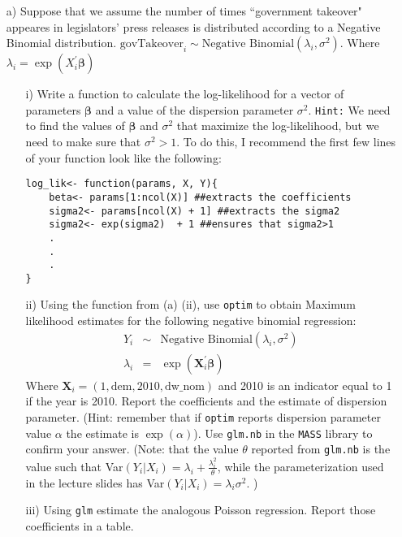\documentclass[letterpaper,12pt]{article}
\numberwithin{equation}{section}
\numberwithin{equation}{section}
\begin{document}
\begin{itemize}
\item[a)] Suppose that we assume the number of times ``government takeover" appeares in legislators' press releases is distributed according to a Negative Binomial distribution. $\text{govTakeover}_{i} \sim \text{Negative Binomial}(\lambda_{i}, \sigma^2)$.   Where $\lambda_{i} = \exp(X_{i}^{'}\boldsymbol{\beta})$
\begin{itemize}
\item[i)] Write a function to calculate the log-likelihood for a vector of parameters $\boldsymbol{\beta}$ and a value of the dispersion parameter $\sigma^2$.  {\tt Hint:} We need to find the values of $\boldsymbol{\beta}$ and $\sigma^2$ that maximize the log-likelihood, but we need to make sure that $\sigma^2>1$.  To do this, I recommend the first few lines of your function look like the following:

\begin{verbatim}
log_lik<- function(params, X, Y){
	beta<- params[1:ncol(X)] ##extracts the coefficients
	sigma2<- params[ncol(X) + 1] ##extracts the sigma2
	sigma2<- exp(sigma2)  + 1 ##ensures that sigma2>1
	.
	.
	.
}
\end{verbatim}

\item[ii)] Using the function from (a) (ii), use {\tt optim} to obtain Maximum likelihood estimates for the following negative binomial regression:
\begin{eqnarray}
Y_{i} & \sim & \text{Negative Binomial}(\lambda_{i}, \sigma^2) \nonumber \\
\lambda_{i} & = & \exp(\boldsymbol{X}_{i}^{'}\boldsymbol{\beta}) \nonumber
\end{eqnarray}
Where $\boldsymbol{X}_{i} = (1, \text{dem}, \text{2010}, \text{dw\_nom})$ and 2010 is an indicator equal to 1 if the year is 2010.  Report the coefficients and the estimate of dispersion parameter.  (Hint: remember that if {\tt optim} reports dispersion parameter value $\alpha$ the estimate is $\exp(\alpha)$).  Use {\tt glm.nb} in the {\tt MASS} library to confirm your answer.  (Note: that the value $\theta$ reported from {\tt glm.nb} is the value such that Var$(Y_{i}|X_{i} ) = \lambda_{i} + \frac{\lambda_{i}^2}{\theta}$, while the parameterization used in the lecture slides has Var$(Y_{i}|X_{i} ) = \lambda_{i} \sigma^2$.  )

\item[iii)] Using {\tt glm} estimate the analogous Poisson regression.  Report those coefficients in a table.
\end{itemize}


\end{itemize}
\end{document}
